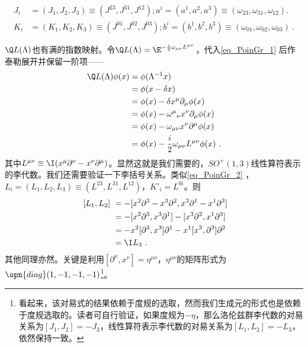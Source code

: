 \begin{equation}\label{eq_PoinGr_2}
\begin{aligned}
J_i&=(J_1,J_2,J_3)\equiv(J^{23},J^{31},J^{12});a^i=(a^1,a^2,a^3)\equiv(\omega_{23},\omega_{31},\omega_{12}).\\
K_i&=(K_1,K_2,K_3)\equiv(J^{01},J^{02},J^{03});b^i=(b^1,b^2,b^3)\equiv(\omega_{01},\omega_{02},\omega_{03})~.
\end{aligned}
\end{equation}

$\Q L(\Lambda)$也有满的指数映射。令$\Q L(\Lambda)=\E^{-\frac{i}{2} \omega_{\mu \nu} L^{\mu \nu}}$，代入\autoref{eq_PoinGr_1} 后作泰勒展开并保留一阶项——
\begin{equation}
\begin{aligned}
\Q L(\Lambda)\phi(x)&=\phi(\Lambda^{-1}x)\\
&=\phi(x-\delta x)\\
&= \phi(x)-\delta x^{\mu} \partial_{\mu} \phi(x) \\
&= \phi(x)-\omega^{\mu}{ }_{\nu} x^{\nu} \partial_{\mu} \phi(x) \\
&=\phi(x)-\omega_{\mu \nu} x^{\nu} \partial^{\mu} \phi(x) \\
&= \phi(x)-\frac{i}{2} \omega_{\mu \nu} L^{\mu \nu} \phi(x)~.
\end{aligned}
\end{equation}
其中$L^{\mu\nu}\equiv\I(x^{\mu}\partial^{\nu}-x^{\nu}\partial^{\mu})$。显然这就是我们需要的，$SO^+(1,3)$线性算符表示的李代数。我们还需要验证一下李括号关系。类似\autoref{eq_PoinGr_2}  ，$L_i=(L_1,L_2,L_3)\equiv(L^{23},L^{31},L^{12})$，$K'_i=L^{0i}$。则
\begin{equation}
\begin{aligned}
~[L_1,L_2]~&=-[x^{2}\partial^{3}-x^{3}\partial^{2},x^{3}\partial^{1}-x^{1}\partial^{3}]\\
&=-[x^2\partial^3,x^3\partial^1]-[x^3\partial^2,x^1\partial^3]\\
&=-x^2[\partial^3,x^3]\partial^1-x^1[x^3,\partial^3]\partial^2\\
&=\I L_3~.
\end{aligned}
\end{equation}
其他同理亦然。关键是利用$[\partial^{\mu},x^{\nu}]=\eta^{\mu\nu}$，$\eta^{\mu\nu}$的矩阵形式为$\opn{diag}(1,-1,-1,-1)$\footnote{看起来，该对易式的结果依赖于度规的选取，然而我们生成元的形式也是依赖于度规选取的。读者可自行验证，如果度规为$-\eta$，那么洛伦兹群李代数的对易关系为$[J_1,J_2]=-J_3$，线性算符表示李代数的对易关系为$[L_1,L_2]=-L_3$，依然保持一致。}。

